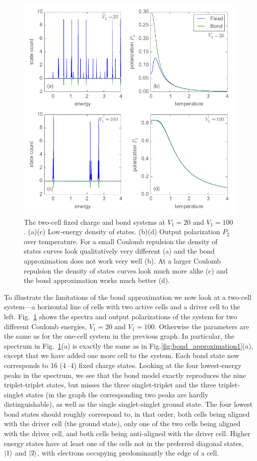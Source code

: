 %
\begin{figure}
  \center
  \includegraphics{bond_approximation2}
  \caption{
  The two-cell fixed charge and bond systems at $V_1 = 20$ and $V_1 = 100$.
  (a)(c) Low-energy density of states. (b)(d) Output polarization $P_2$ over
  temperature. For a small Coulomb repulsion the density of states curves look
  qualitatively very different (a) and the bond approximation does not work very
  well (b). At a larger Coulomb repulsion the density of states curves look much
  more alike (c) and the bond approximation works much better (d).
  }
  \label{fig:bond_approximation2}
\end{figure}
%
To illustrate the limitations of the bond approximation we now look at a
two-cell system---a horizontal line of cells with two active cells and a driver
cell to the left. Fig.~\ref{fig:bond_approximation2} shows the spectra and
output polarizations of the system for two different Coulomb energies, $V_1 =
20$ and $V_1 = 100$. Otherwise the parameters are the same as for the one-cell
system in the previous graph. In particular, the spectrum in
Fig.~\ref{fig:bond_approximation2}(a) is exactly the same as in
Fig.\ref{fig:bond_approximation1}(a), except that we have added one more cell to
the system. Each bond state now corresponds to 16 ($4 \cdot 4$) fixed charge
states. Looking at the four lowest-energy peaks in the spectrum, we see that the
bond model exactly reproduces the nine triplet-triplet states, but misses the
three singlet-triplet and the three triplet-singlet states (in the graph the
corresponding two peaks are hardly distinguishable), as well as the single
singlet-singlet ground state. The four lowest bond states should roughly
correspond to, in that order, both cells being aligned with the driver cell (the
ground state), only one of the two cells being aligned with the driver cell, and
both cells being anti-aligned with the driver cell. Higher energy states have at
least one of the cells not in the preferred diagonal states, $\left|1\right>$ and
$\left|2\right>$, with electrons occupying predominantly the edge of a cell.

